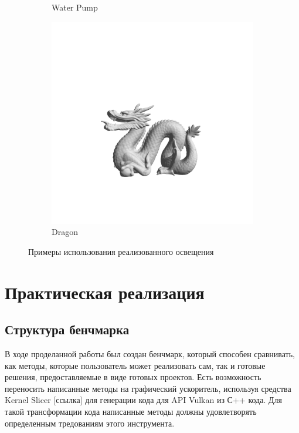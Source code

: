 \documentclass[a4paper,hidelinks,12pt]{article}
\begin{document}
\begin{figure}[ht]
\begin{subfigure}[b]{0.3\textwidth}
			\caption{Water Pump}
			\label{fig:img2}
	\end{subfigure}
	\hfill
	\begin{subfigure}[b]{0.3\textwidth}
			\includegraphics[width=\textwidth]{dragon.png}
			\caption{Dragon}
			\label{fig:img3}
	\end{subfigure}
	\caption{Примеры использования реализованного освещения}
	\label{fig:three-in-row}
\end{figure}

\newpage

\section{Практическая реализация}

\subsection{Структура бенчмарка}

В ходе проделанной работы был создан бенчмарк, который способен сравнивать, как методы, которые пользователь может реализовать сам, так и готовые решения, 
предоставляемые в виде готовых проектов. Есть возможность переносить написанные методы на графический ускоритель, используя средства Kernel Slicer [ссылка] для генерации кода для 
API Vulkan из С++ кода. Для такой трансформации кода написанные методы должны удовлетворять определенным тредованиям этого инструмента. 
\end{document}
